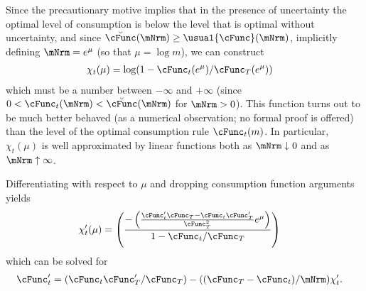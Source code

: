 \documentclass[\econtexRoot/BufferStockTheory]{subfiles}
\begin{document}
Since the precautionary motive implies that in the presence of
uncertainty the optimal level of consumption is below the level that is
optimal without uncertainty, and since $\breve{\cFunc}(\mNrm) \geq \usual{\cFunc}(\mNrm)$,
implicitly defining $\mNrm = e^{\mu}$ (so that $\mu = \log m$), we can construct
\begin{equation}\begin{gathered}\begin{aligned}
 \chi_{t}(\mu)  & = \log (1-\cFunc_{t}(e^{\mu})/\cFunc_{T}(e^{\mu}))  \label{eq:ChiDef}
\end{aligned}\end{gathered}\end{equation}
which must be a number between $-\infty$ and $+\infty$ (since $0 < \cFunc_{t}(\mNrm) < \breve{\cFunc}(\mNrm)$ for $\mNrm > 0$).  This function turns out to be much better behaved (as
a numerical observation; no formal proof is offered) than the level of the optimal consumption rule $\cFunc_{t}(m)$.  In particular, $\chi_{t}(\mu)$ is well approximated by linear functions both as $\mNrm \downarrow 0$ and as $\mNrm \uparrow \infty$.

Differentiating with respect to $\mu$ and dropping consumption function arguments
yields
\begin{equation}\begin{gathered}\begin{aligned}
 \chi^{\prime}_{t}(\mu)  & = \left(\frac{-\left(\frac{\cFunc^{\prime}_{t}\cFunc_{T}-\cFunc_{t}\cFunc_{T}^{\prime}}{\cFunc_{T}^{2}}e^{\mu}\right)}{1-\cFunc_{t}/\cFunc_{T}}\right) \label{eq:ChiPDef}
\end{aligned}\end{gathered}\end{equation}
which can be solved for
\begin{equation}\begin{gathered}\begin{aligned}
 \cFunc^{\prime}_{t}  & = (\cFunc_{t}\cFunc_{T}^{\prime}/\cFunc_{T})-((\cFunc_{T}-\cFunc_{t})/\mNrm)\chi^{\prime}_{t} \label{eq:cFuncPFromChi}.
\end{aligned}\end{gathered}\end{equation}
\end{document}
